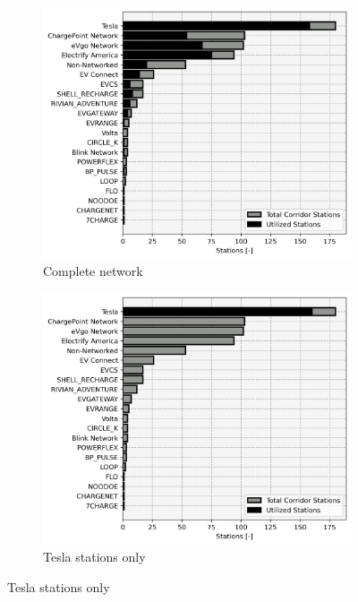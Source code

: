 \begin{figure}[H]

\begin{subfigure}{\linewidth/3}
	\centering\captionsetup{width = .8\linewidth}
	\includegraphics[width = \linewidth]{figs/corridor_station_utilization_0.png}
	\caption{Complete network}
\end{subfigure}%
\begin{subfigure}{\linewidth/3}
	\centering\captionsetup{width = .8\linewidth}
	\includegraphics[width = \linewidth]{figs/corridor_station_utilization_1.png}
	\caption{Tesla stations only}

\end{subfigure}
\end{figure}
